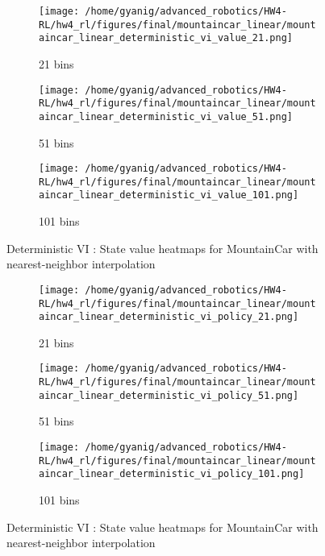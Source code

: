 \documentclass{article}
\begin{document}
\begin{figure}[h]
    \centering
    \begin{subfigure}{0.32\textwidth}
        \texttt{[image: /home/gyanig/advanced\_robotics/HW4-RL/hw4\_rl/figures/final/mountaincar\_linear/mountaincar\_linear\_deterministic\_vi\_value\_21.png]}
        \caption{21 bins}
    \end{subfigure}
    \begin{subfigure}{0.32\textwidth}
        \texttt{[image: /home/gyanig/advanced\_robotics/HW4-RL/hw4\_rl/figures/final/mountaincar\_linear/mountaincar\_linear\_deterministic\_vi\_value\_51.png]}
        \caption{51 bins}
    \end{subfigure}
    \begin{subfigure}{0.32\textwidth}
        \texttt{[image: /home/gyanig/advanced\_robotics/HW4-RL/hw4\_rl/figures/final/mountaincar\_linear/mountaincar\_linear\_deterministic\_vi\_value\_101.png]}
        \caption{101 bins}
    \end{subfigure}
    \caption{Deterministic VI : State value heatmaps for MountainCar with nearest-neighbor interpolation}
\end{figure}


\begin{figure}[h]
    \centering
    \begin{subfigure}{0.32\textwidth}
        \texttt{[image: /home/gyanig/advanced\_robotics/HW4-RL/hw4\_rl/figures/final/mountaincar\_linear/mountaincar\_linear\_deterministic\_vi\_policy\_21.png]}
        \caption{21 bins}
    \end{subfigure}
    \begin{subfigure}{0.32\textwidth}
        \texttt{[image: /home/gyanig/advanced\_robotics/HW4-RL/hw4\_rl/figures/final/mountaincar\_linear/mountaincar\_linear\_deterministic\_vi\_policy\_51.png]}
        \caption{51 bins}
    \end{subfigure}
    \begin{subfigure}{0.32\textwidth}
        \texttt{[image: /home/gyanig/advanced\_robotics/HW4-RL/hw4\_rl/figures/final/mountaincar\_linear/mountaincar\_linear\_deterministic\_vi\_policy\_101.png]}
        \caption{101 bins}
    \end{subfigure}
    \caption{Deterministic VI : State value heatmaps for MountainCar with nearest-neighbor interpolation}
\end{figure}
\end{document}
